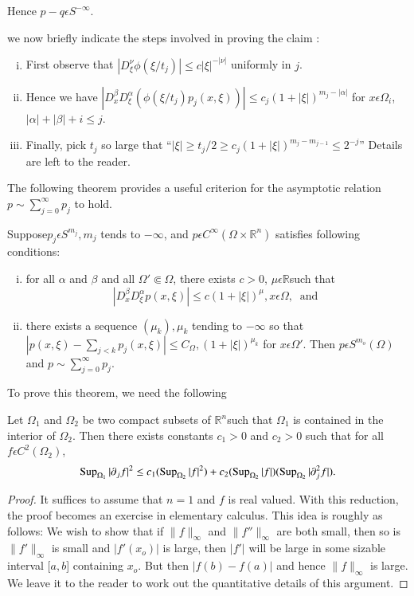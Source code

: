 Hence $p-q \epsilon S^{-\infty}$.

we now briefly indicate the steps involved in proving the claim :
\begin{enumerate}[i)]
\item First observe that $| D^\nu_\xi \phi (\xi/t_j)| \le c|\xi|^{-|\nu|}$
  uniformly in $j$. 
\item Hence we have $|D^\beta_x D^\alpha_\xi(\phi(\xi/t_j)p_j(x,\xi))|
  \le c_j(1+|\xi|)^{m_j -|\alpha|}$ for $x \epsilon \Omega_i$,
  $|\alpha|+|\beta|+i \le j$. 
\item Finally,  pick $t_j$ so large that ``$|\xi| \ge t_j/2 \ge
  c_j(1+|\xi|)^{m_j-m_{j-1}} \le 2^{-j}$'' Details are left to the
  reader. 
\end{enumerate}

The following theorem provides a useful criterion for the asymptotic
relation $p \sim \sum \limits^{\infty}_{j=0}p_j$ to hold. 

\setcounter{thm}{19}
\begin{thm} \label{chap4:sec3:thm4.20} 
  Suppose\pageoriginale $p_j \epsilon S^{m_j},m_j$ tends to $-\infty$, and $p
  \epsilon C^\infty (\Omega \times \mathbb{R}^n)$ satisfies
  following conditions: 
  \begin{enumerate}[i)]
  \item for all $\alpha$ and $\beta$ and all $\Omega' \Subset
    \Omega$, there exists $c>0$, $\mu \epsilon \mathbb{R}$such that 
    $$
    |D^\beta_x D^\alpha_\xi p(x, \xi)| \le c(1+|\xi|)^\mu, x \epsilon
    \Omega, ~\text{ and } 
    $$
  \item there exists a sequence $(\mu_k),\mu_k$ tending to
    $-\infty$ so that $|p(x,\xi)-\sum\limits_{j < k}p_j(x,\xi)|\le
    C_\Omega, (1+|\xi|)^{\mu_k}$  for  $x \epsilon
    \Omega'$. Then $p \epsilon S^{m_o}(\Omega)$ and $p \sim \sum
    \limits^{\infty}_{j=0}p_j$. 
  \end{enumerate}
\end{thm}

To prove this theorem, we need the following
\setcounter{lem}{20}
\begin{lem} \label{chap4:sec3:lem4.21} %
  Let $\Omega_1$ and $\Omega_2$ be two compact subsets of
  $\mathbb{R}^n$such that $\Omega_1$ is contained in the interior of
  $\Omega_2$. Then there exists constants $c_1 >0$ and $c_2 > 0$ such
  that for all $f \epsilon C^2 (\Omega_2)$, 
  $$
  \operatorname{Sup}_{\Omega_1}|
  \partial_jf|^2 \le c_1(\operatorname{Sup}_{\Omega_2}|f|^2)+c_2
  (\operatorname{Sup}_{\Omega_2}|f|)(\operatorname{Sup}_{\Omega_2}|\partial^2_jf|). 
  $$
\end{lem}
\begin{proof}
  It suffices to assume that $n=1$ and $f$ is real valued.
  With this reduction, the proof becomes an exercise in elementary calculus.
  This idea is roughly as follows: We wish to show that if $\parallel f
  \parallel_\infty$ and $\parallel f'' \parallel_\infty$ are both small,
  then so is $\parallel f'\parallel_\infty$ is small and $|f '(x_o)|$ is
  large, then $|f'|$ will be large in some sizable interval [$a,b$]
  containing $x_o$. But then $|f(b)-f(a)|$ and hence $\parallel f
  \parallel_\infty$ is large. We leave it to the reader to work out the
  quantitative details of this argument. 
\end{proof}

